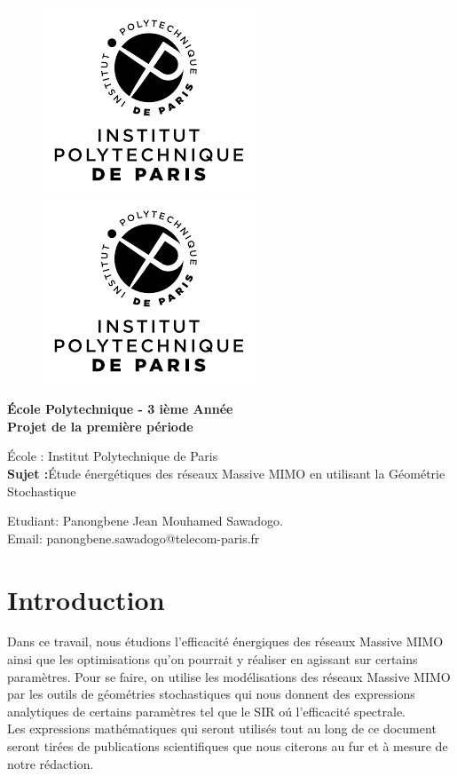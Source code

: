 \documentclass[12pt,onecolumn]{article}
\begin{document}
\begin{figure}
	\begin{flushleft}
        \includegraphics[width=0.3\linewidth]{2}
        \hspace{5.2cm}
        \includegraphics[width=0.3\linewidth]{2}
	\end{flushleft}
 \vspace{2.2cm}
\end{figure} 
	\begin{center}
		\textbf{École Polytechnique - 3 ième Année }\\[0.4cm]
		\textbf{Projet de la première période}
		\\[3.5cm]
	\end{center}
    \begin{center}
    	École : Institut Polytechnique de Paris\\[0.5cm]
    	\textbf{Sujet :}Étude énergétiques des réseaux Massive MIMO en utilisant la Géométrie Stochastique \\[1cm]
    \end{center}
  	\vspace{3.0cm}
	\begin{flushleft}
			Etudiant: Panongbene Jean Mouhamed Sawadogo.\\
			Email: panongbene.sawadogo@telecom-paris.fr
	\end{flushleft}
\thispagestyle{empty}
\setcounter{page}{0}
\newpage
\thispagestyle{empty}
\setcounter{page}{0}
\tableofcontents
\newpage
\section{Introduction}
Dans ce travail, nous étudions l’efficacité énergiques des réseaux Massive MIMO ainsi que les optimisations qu'on pourrait y réaliser en agissant sur certains paramètres. Pour se faire, on utilise les modélisations des réseaux Massive MIMO par les outils de géométries stochastiques qui nous donnent des expressions analytiques de certains paramètres tel que le SIR o\'u l’efficacité spectrale.\\
Les expressions mathématiques qui seront utilisés tout au long de ce document seront tirées de publications scientifiques que nous citerons au fur et à mesure de notre rédaction.
\newpage
\end{document}
